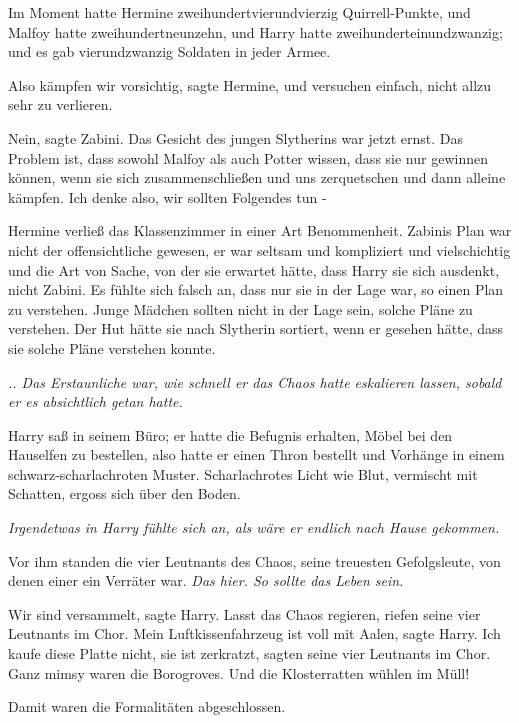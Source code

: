 Im Moment hatte Hermine zweihundertvierundvierzig Quirrell-Punkte, und Malfoy
hatte zweihundertneunzehn, und Harry hatte zweihunderteinundzwanzig; und es gab
vierundzwanzig Soldaten in jeder Armee.

\glqq{}Also kämpfen wir vorsichtig\grqq{}, sagte Hermine, \glqq{}und versuchen
einfach, nicht allzu sehr zu verlieren.\grqq{}

\glqq{}Nein\grqq{}, sagte Zabini. Das Gesicht des jungen Slytherins war jetzt
ernst. \glqq{}Das Problem ist, dass sowohl Malfoy als auch Potter wissen, dass
sie nur gewinnen können, wenn sie sich zusammenschließen und uns zerquetschen
und dann alleine kämpfen. Ich denke also, wir sollten Folgendes tun -\grqq{}

Hermine verließ das Klassenzimmer in einer Art Benommenheit. Zabinis Plan war
nicht der offensichtliche gewesen, er war seltsam und kompliziert und
vielschichtig und die Art von Sache, von der sie erwartet hätte, dass Harry sie
sich ausdenkt, nicht Zabini. Es fühlte sich falsch an, dass nur sie in der Lage
war, so einen Plan zu verstehen. Junge Mädchen sollten nicht in der Lage sein,
solche Pläne zu verstehen. Der Hut hätte sie nach Slytherin sortiert, wenn er
gesehen hätte, dass sie solche Pläne verstehen konnte.

\emph{.. Das Erstaunliche war, wie schnell er das Chaos hatte eskalieren lassen,
sobald er es absichtlich getan hatte.}

Harry saß in seinem Büro; er hatte die Befugnis erhalten, Möbel bei den
Hauselfen zu bestellen, also hatte er einen Thron bestellt und Vorhänge in einem
schwarz-scharlachroten Muster. Scharlachrotes Licht wie Blut, vermischt mit
Schatten, ergoss sich über den Boden.

\emph{Irgendetwas in Harry fühlte sich an, als wäre er endlich nach Hause
gekommen.}

Vor ihm standen die vier Leutnants des Chaos, seine treuesten Gefolgsleute, von
denen einer ein Verräter war.\emph{ Das hier. So sollte das Leben sein.}

\glqq{}Wir sind versammelt\grqq{}, sagte Harry. \glqq{}Lasst das Chaos
regieren\grqq{}, riefen seine vier Leutnants im Chor. \glqq{}Mein
Luftkissenfahrzeug ist voll mit Aalen\grqq{}, sagte Harry. \glqq{}Ich kaufe diese
Platte nicht, sie ist zerkratzt\grqq{}, sagten seine vier Leutnants im Chor.
\glqq{}Ganz mimsy waren die Borogroves.\grqq{} \glqq{}Und die Klosterratten wühlen im
Müll!\grqq{}

Damit waren die Formalitäten abgeschlossen.

